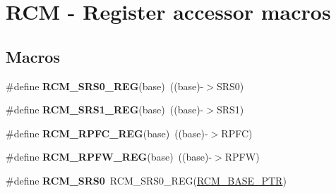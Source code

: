 \hypertarget{group___r_c_m___register___accessor___macros}{}\section{R\+CM -\/ Register accessor macros}
\label{group___r_c_m___register___accessor___macros}
\subsection*{Macros}
\begin{DoxyCompactItemize}
\item 
\mbox{\label{group___r_c_m___register___accessor___macros_gab75f78e13fd4a015cada6728b29c681c}} 
\#define {\bfseries R\+C\+M\+\_\+\+S\+R\+S0\+\_\+\+R\+EG}(base)~((base)-\/$>$S\+R\+S0)
\item 
\mbox{\label{group___r_c_m___register___accessor___macros_ga6b4794a4c891e1ede19dc7a446870489}} 
\#define {\bfseries R\+C\+M\+\_\+\+S\+R\+S1\+\_\+\+R\+EG}(base)~((base)-\/$>$S\+R\+S1)
\item 
\mbox{\label{group___r_c_m___register___accessor___macros_ga361aa484c058d992d93d6f61316029f3}} 
\#define {\bfseries R\+C\+M\+\_\+\+R\+P\+F\+C\+\_\+\+R\+EG}(base)~((base)-\/$>$R\+P\+FC)
\item 
\mbox{\label{group___r_c_m___register___accessor___macros_ga0be970e23a295c11f2e80b9f83ae4dbe}} 
\#define {\bfseries R\+C\+M\+\_\+\+R\+P\+F\+W\+\_\+\+R\+EG}(base)~((base)-\/$>$R\+P\+FW)
\item 
\mbox{\label{group___r_c_m___register___accessor___macros_gaae0200bfd0eb1d7f7fd0d142c21fe92a}} 
\#define {\bfseries R\+C\+M\+\_\+\+S\+R\+S0}~R\+C\+M\+\_\+\+S\+R\+S0\+\_\+\+R\+EG(\hyperlink{group___r_c_m___peripheral_ga25ab3aa8d593d455ed36a52c77f88234}{R\+C\+M\+\_\+\+B\+A\+S\+E\+\_\+\+P\+TR})
\item 
\mbox{\label{group___r_c_m___register___accessor___macros_gaa2e190bc843511a82e9ec826029fbaaa}} 

\end{DoxyCompactItemize}
